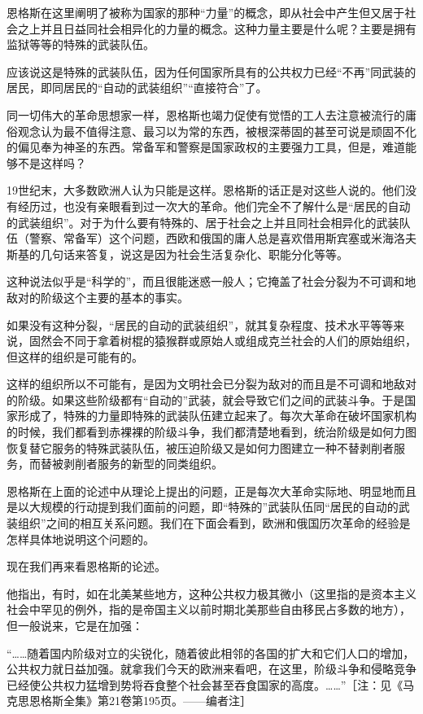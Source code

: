 \documentclass[UTF8, 12pt, a4paper]{ctexrep}
\begin{document}
恩格斯在这里阐明了被称为国家的那种“力量”的概念，即从社会中产生但又居于社会之上并且日益同社会相异化的力量的概念。这种力量主要是什么呢？主要是拥有监狱等等的特殊的武装队伍。

应该说这是特殊的武装队伍，因为任何国家所具有的公共权力已经“不再”同武装的居民，即同居民的“自动的武装组织”“直接符合”了。

同一切伟大的革命思想家一样，恩格斯也竭力促使有觉悟的工人去注意被流行的庸俗观念认为最不值得注意、最习以为常的东西，被根深蒂固的甚至可说是顽固不化的偏见奉为神圣的东西。常备军和警察是国家政权的主要强力工具，但是，难道能够不是这样吗？

19世纪末，大多数欧洲人认为只能是这样。恩格斯的话正是对这些人说的。他们没有经历过，也没有亲眼看到过一次大的革命。他们完全不了解什么是“居民的自动的武装组织”。对于为什么要有特殊的、居于社会之上并且同社会相异化的武装队伍（警察、常备军）这个问题，西欧和俄国的庸人总是喜欢借用斯宾塞或米海洛夫斯基的几句话来答复，说这是因为社会生活复杂化、职能分化等等。

这种说法似乎是“科学的”，而且很能迷惑一般人；它掩盖了社会分裂为不可调和地敌对的阶级这个主要的基本的事实。

如果没有这种分裂，“居民的自动的武装组织”，就其复杂程度、技术水平等等来说，固然会不同于拿着树棍的猿猴群或原始人或组成克兰社会的人们的原始组织，但这样的组织是可能有的。

这样的组织所以不可能有，是因为文明社会已分裂为敌对的而且是不可调和地敌对的阶级。如果这些阶级都有“自动的”武装，就会导致它们之间的武装斗争。于是国家形成了，特殊的力量即特殊的武装队伍建立起来了。每次大革命在破坏国家机构的时候，我们都看到赤裸裸的阶级斗争，我们都清楚地看到，统治阶级是如何力图恢复替它服务的特殊武装队伍，被压迫阶级又是如何力图建立一种不替剥削者服务，而替被剥削者服务的新型的同类组织。

恩格斯在上面的论述中从理论上提出的问题，正是每次大革命实际地、明显地而且是以大规模的行动提到我们面前的问题，即“特殊的”武装队伍同“居民的自动的武装组织”之间的相互关系问题。我们在下面会看到，欧洲和俄国历次革命的经验是怎样具体地说明这个问题的。

现在我们再来看恩格斯的论述。

他指出，有时，如在北美某些地方，这种公共权力极其微小（这里指的是资本主义社会中罕见的例外，指的是帝国主义以前时期北美那些自由移民占多数的地方），但一般说来，它是在加强：

“……随着国内阶级对立的尖锐化，随着彼此相邻的各国的扩大和它们人口的增加，公共权力就日益加强。就拿我们今天的欧洲来看吧，在这里，阶级斗争和侵略竞争已经使公共权力猛增到势将吞食整个社会甚至吞食国家的高度。……”［注：见《马克思恩格斯全集》第21卷第195页。——编者注］
\end{document}
